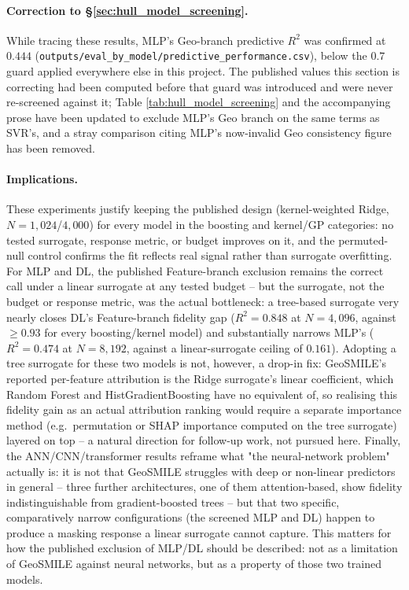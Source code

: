 \paragraph{Correction to \S\ref{sec:hull_model_screening}.} While tracing
these results, MLP's Geo-branch predictive $R^2$ was confirmed at $0.444$
(\texttt{outputs/eval\_by\_model/predictive\_performance.csv}), below the
$0.7$ guard applied everywhere else in this project. The published values
this section is correcting had been computed before that guard was
introduced and were never re-screened against it; Table
\ref{tab:hull_model_screening} and the accompanying prose have been updated
to exclude MLP's Geo branch on the same terms as SVR's, and a stray
comparison citing MLP's now-invalid Geo consistency figure has been removed.

\paragraph{Implications.} These experiments justify keeping the published
design (kernel-weighted Ridge, $N=1{,}024$/$4{,}000$) for every model in the
boosting and kernel/GP categories: no tested surrogate, response metric, or
budget improves on it, and the permuted-null control confirms the fit
reflects real signal rather than surrogate overfitting. For MLP and DL, the
published Feature-branch exclusion remains the correct call under a linear
surrogate at any tested budget -- but the surrogate, not the budget or
response metric, was the actual bottleneck: a tree-based surrogate very
nearly closes DL's Feature-branch fidelity gap ($R^2=0.848$ at $N{=}4{,}096$,
against $\ge0.93$ for every boosting/kernel model) and substantially narrows
MLP's ($R^2=0.474$ at $N{=}8{,}192$, against a linear-surrogate ceiling of
$0.161$). Adopting a tree surrogate for these two models is not, however, a
drop-in fix: GeoSMILE's reported per-feature attribution is the Ridge
surrogate's linear coefficient, which Random Forest and HistGradientBoosting
have no equivalent of, so realising this fidelity gain as an actual
attribution ranking would require a separate importance method (e.g.\
permutation or SHAP importance computed on the tree surrogate) layered on
top -- a natural direction for follow-up work, not pursued here. Finally,
the ANN/CNN/transformer results reframe what "the neural-network problem"
actually is: it is not that GeoSMILE struggles with deep or non-linear
predictors in general -- three further architectures, one of them
attention-based, show fidelity indistinguishable from gradient-boosted
trees -- but that two specific, comparatively narrow configurations (the
screened MLP and DL) happen to produce a masking response a linear
surrogate cannot capture. This matters for how the published exclusion of
MLP/DL should be described: not as a limitation of GeoSMILE against neural
networks, but as a property of those two trained models.
